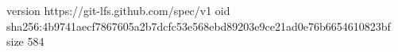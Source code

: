 version https://git-lfs.github.com/spec/v1
oid sha256:4b9741aecf7867605a2b7dcfc53e568ebd89203e9ce21ad0e76b6654610823bf
size 584
